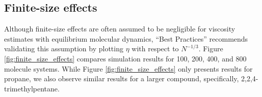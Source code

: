 \documentclass[preprint,review,12pt]{elsarticle}
\begin{document}
%	

	\subsection{Finite-size effects}

	Although finite-size effects are often assumed to be negligible for viscosity estimates with equilibrium molecular dynamics, ``Best Practices'' recommends validating this assumption by plotting $\eta$ with respect to $N^{-1/3}$. Figure \ref{fig:finite_size_effects} compares simulation results for 100, 200, 400, and 800 molecule systems. While Figure \ref{fig:finite_size_effects} only presents results for propane, we also observe similar results for a larger compound, specifically, 2,2,4-trimethylpentane.
	
\end{document}
